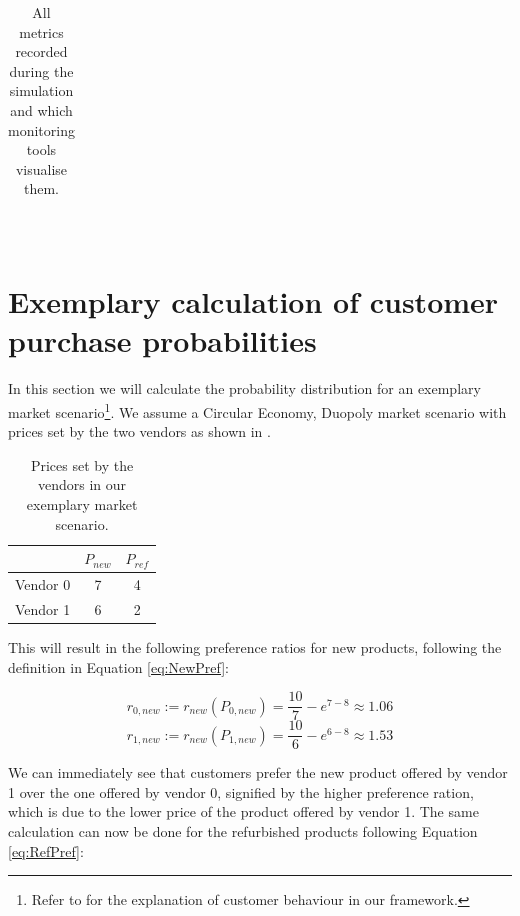\begin{table}[!tbp]
\begin{tabular}{|cr|p{2.2mm}|p{2.2mm}|p{2.2mm}|p{2.2mm}|p{2.2mm}|p{2.2mm}|p{2.2mm}|p{2.2mm}|p{2.2mm}|p{2.2mm}|p{2.2mm}|p{2.2mm}|p{2.2mm}|p{2.2mm}|p{2.2mm}|p{2.2mm}|}
	\end{tabular}\\
	\caption{All metrics recorded during the simulation and which monitoring tools visualise them.}\label{tab:AllMetrics}
\end{table}

\newpage

\section{Exemplary calculation of customer purchase probabilities}\label{sec:customerPropExample}

In this section we will calculate the probability distribution for an exemplary market scenario\footnote{Refer to  for the explanation of customer behaviour in our framework.}. We assume a Circular Economy, Duopoly market scenario with prices set by the two vendors as shown in .

\begin{table}[!htb]
	\begin{tabular}{|r|c|c|}
		\hline
		         & \(P_{new}\) & \(P_{ref}\) \\\hline
		Vendor 0 & 7           & 4           \\\hline
		Vendor 1 & 6           & 2           \\\hline
	\end{tabular}\medskip
	\caption{Prices set by the vendors in our exemplary market scenario.}\label{tab:CustomerExamplePrices}
\end{table}

\noindent This will result in the following preference ratios for new products, following the definition in Equation \eqref{eq:NewPref}:

\begin{equation}
	r_{0,new} := r_{new}(P_{0,new}) = \frac{10}{7} - e^{7 - 8} \approx 1.06
\end{equation}
\begin{equation}
	r_{1,new} := r_{new}(P_{1,new}) = \frac{10}{6} - e^{6 - 8} \approx 1.53
\end{equation}

We can immediately see that customers prefer the new product offered by vendor 1 over the one offered by vendor 0, signified by the higher preference ration, which is due to the lower price of the product offered by vendor 1. The same calculation can now be done for the refurbished products following Equation \eqref{eq:RefPref}:

